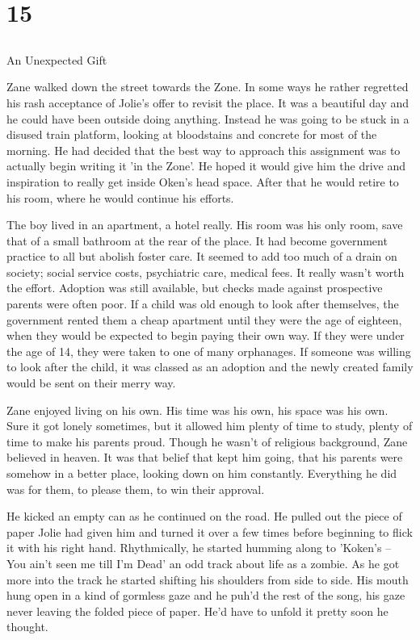 \chapter{15}
\section{}
An Unexpected Gift  

Zane walked down the street towards the Zone.  In some ways he rather regretted his rash acceptance of Jolie's offer to revisit the place.  It was a beautiful day and he could have been outside doing anything.  Instead he was going to be stuck in a disused train platform, looking at bloodstains and concrete for most of the morning.  He had decided that the best way to approach this assignment was to actually begin writing it 'in the Zone'.  He hoped it would give him the drive and inspiration to really get inside Oken's head space.  After that he would retire to his room, where he would continue his efforts.  

The boy lived in an apartment, a hotel really.  His room was his only room, save that of a small bathroom at the rear of the place.  It had become government practice to all but abolish foster care.  It seemed to add too much of a drain on society; social service costs, psychiatric care, medical fees.  It really wasn't worth the effort.  Adoption was still available, but checks made against prospective parents were often poor.  If a child was old enough to look after themselves, the government rented them a cheap apartment until they were the age of eighteen, when they would be expected to begin paying their own way.  If they were under the age of 14, they were taken to one of many orphanages.  If someone was willing to look after the child, it was classed as an adoption and the newly created family would be sent on their merry way.

Zane enjoyed living on his own.  His time was his own, his space was his own.  Sure it got lonely sometimes, but it allowed him plenty of time to study, plenty of time to make his parents proud.  Though he wasn't of religious background, Zane believed in heaven.  It was that belief that kept him going, that his parents were somehow in a better place, looking down on him constantly.  Everything he did was for them, to please them, to win their approval.  

He kicked an empty can as he continued on the road.  He pulled out the piece of paper Jolie had given him and turned it over a few times before beginning to flick it with his right hand.  Rhythmically, he started humming along to 'Koken's – You ain't seen me till I'm Dead' an odd track about life as a zombie.  As he got more into the track he started shifting his shoulders from side to side.  His mouth hung open in a kind of gormless gaze and he puh'd the rest of the song, his gaze never leaving the folded piece of paper.    He'd have to unfold it pretty soon he thought.  

